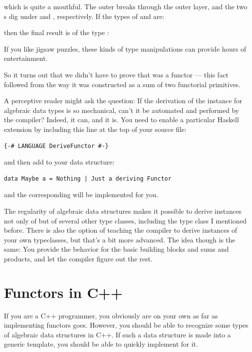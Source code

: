 which is quite a mouthful. The outer  breaks through the
outer  layer, and the two s dig under
 and , respectively. If the types of 
and  are:

then the final result is of the type
:

If you like jigsaw puzzles, these kinds of type manipulations can
provide hours of entertainment.

So it turns out that we didn't have to prove that  was a
functor --- this fact followed from the way it was constructed as a sum
of two functorial primitives.

A perceptive reader might ask the question: If the derivation of the
 instance for algebraic data types is so mechanical,
can't it be automated and performed by the compiler? Indeed, it can, and
it is. You need to enable a particular Haskell extension by including
this line at the top of your source file:

\begin{Verbatim}
{-# LANGUAGE DeriveFunctor #-}
\end{Verbatim}
and then add  to your data structure:

\begin{Verbatim}
data Maybe a = Nothing | Just a deriving Functor
\end{Verbatim}
and the corresponding  will be implemented for you.

The regularity of algebraic data structures makes it possible to derive
instances not only of  but of several other type
classes, including the  type class I mentioned before. There
is also the option of teaching the compiler to derive instances of your
own typeclasses, but that's a bit more advanced. The idea though is the
same: You provide the behavior for the basic building blocks and sums
and products, and let the compiler figure out the rest.

\section{Functors in C++}

If you are a C++ programmer, you obviously are on your own as far as
implementing functors goes. However, you should be able to recognize
some types of algebraic data structures in C++. If such a data structure
is made into a generic template, you should be able to quickly implement
 for it.

